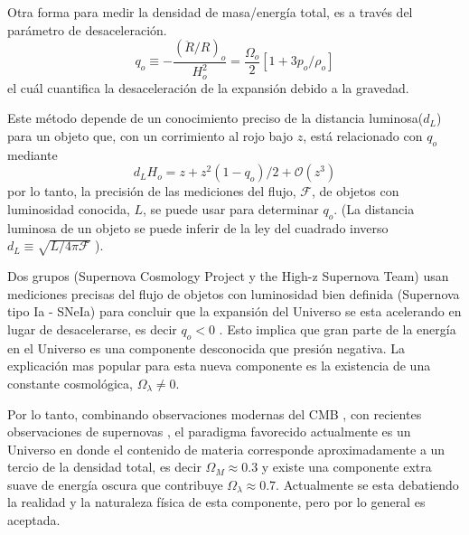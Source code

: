 
Otra forma para medir la densidad de masa/energía total, es a través del parámetro de desaceleración.
\begin{equation*}
    q_o \equiv -\frac{ ( \ddot{R}/R )_o }{H^2_o} = \frac{\Omega_o}{2}\left[ 1 + 3p_o/\rho_o \right]
\end{equation*}
el cuál cuantifica la desaceleración de la expansión debido a la gravedad.

Este método depende de un conocimiento preciso de la distancia luminosa($d_L$) para un objeto que, con un corrimiento al rojo bajo $z$, está relacionado con $q_o$ mediante
\begin{equation}
    d_LH_o = z +z^2(1-q_o)/2 +\mathcal{O}(z^3)
    \label{eq:dlho}
\end{equation}
por lo tanto, la precisión de las mediciones del flujo, $\mathcal{F}$, de objetos con luminosidad conocida, $L$, se puede usar para determinar $q_o$. (La distancia luminosa de un objeto se puede inferir de la ley del cuadrado inverso $d_L \equiv \sqrt{ L/4\pi\mathcal{F}}$ ).

Dos grupos (Supernova Cosmology Project y the High-z Supernova Team) usan mediciones precisas del flujo de objetos con luminosidad bien definida (Supernova tipo Ia - SNeIa) para concluir que la expansión del Universo se esta acelerando en lugar de desacelerarse, es decir $q_o < 0$ \cite{1998Natur.391...51P, 1998ApJ...507...46S}. Esto implica que gran parte de la energía en el Universo es una componente desconocida que presión negativa. La explicación mas popular para esta nueva componente es la existencia de una constante cosmológica, $\Omega_{\lambda} \neq 0$.%

Por lo tanto, combinando observaciones modernas del CMB \cite{ 2013ApJS..208...20B, 2020A&A...641A...1P } , con recientes observaciones de supernovas \cite{1999ApJ...517..565P, 2006ApJ...644....1C}, el paradigma favorecido actualmente es un Universo en donde el contenido de materia corresponde aproximadamente a un tercio de la densidad total, es decir $\Omega_M \approx 0.3$ y existe una componente extra suave de energía oscura que contribuye $\Omega_{\lambda} \approx 0.7$. Actualmente se esta debatiendo la realidad y la naturaleza física de esta componente, pero por lo general es aceptada.

